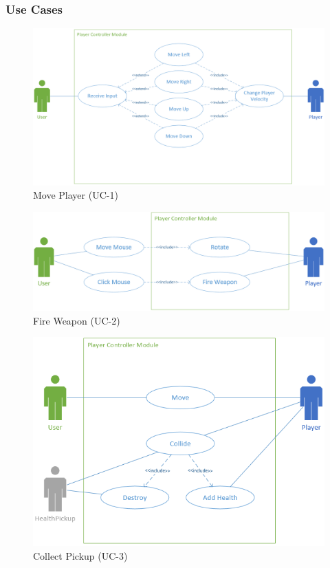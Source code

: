 \documentclass[12pt]{report}
\begin{document}
	\subsubsection{Use Cases}
	\begin{figure}
		\centering
		\includegraphics[scale=0.5]{images/Move.png}
		\caption{Move Player (UC-1)}
	\end{figure}
	\begin{figure}
		\centering
		\includegraphics[scale=0.5]{images/FireWeapon.png}
		\caption{Fire Weapon (UC-2)}
	\end{figure}
	\begin{figure}
		\centering
		\includegraphics[scale=0.5]{images/CollectPickup.png}
		\caption{Collect Pickup (UC-3)}
	\end{figure}
\end{document}
